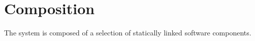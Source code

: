 \section{Composition}\label{Composition}

The system is composed of a selection of statically linked software components.




